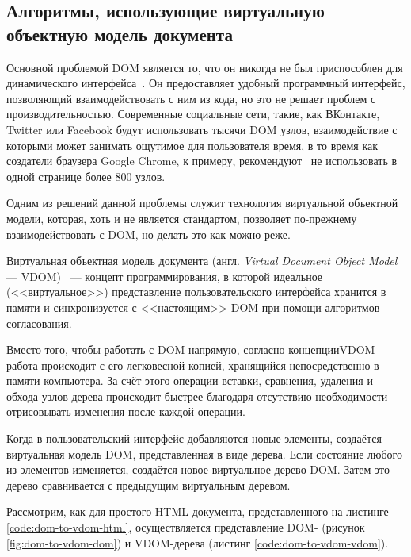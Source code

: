 \subsection{Алгоритмы, использующие виртуальную объектную модель документа}

Основной проблемой DOM является то, что он никогда не был приспособлен для динамического интерфейса~\cite{not-dynamic}.
Он предоставляет удобный программный интерфейс, позволяющий взаимодействовать с ним из кода, но это не решает проблем с производительностью.
Современные социальные сети, такие, как ВКонтакте, Twitter или Facebook будут использовать тысячи DOM узлов, взаимодействие с которыми может занимать ощутимое для пользователя время, в то время как создатели браузера Google Chrome, к примеру, рекомендуют~\cite{dom-max} не использовать в одной странице более 800 узлов.

Одним из решений данной проблемы служит технология виртуальной объектной модели, которая, хоть  и не является стандартом, позволяет по-прежнему взаимодействовать с DOM, но делать это как можно реже.

Виртуальная объектная модель документа (англ. \textit{Virtual Document Object Model} --- VDOM)~\cite{vdom} ---  концепт программирования, в которой идеальное (<<виртуальное>>) представление пользовательского интерфейса хранится в памяти и синхронизуется с <<настоящим>> DOM при помощи алгоритмов согласования.

Вместо того, чтобы работать с DOM напрямую, согласно концепции\break VDOM работа происходит с его легковесной копией, хранящийся непосредственно в памяти компьютера.
За счёт этого операции вставки, сравнения, удаления и обхода узлов дерева происходит быстрее благодаря отсутствию необходимости отрисовывать изменения после каждой операции.

Когда в пользовательский интерфейс добавляются новые элементы, создаётся виртуальная модель DOM, представленная в виде дерева.
Если состояние любого из элементов изменяется, создаётся новое виртуальное дерево DOM.
Затем это дерево сравнивается с предыдущим виртуальным деревом.


Рассмотрим, как для простого  HTML документа, представленного на листинге \ref{code:dom-to-vdom-html}, осуществляется представление DOM- (рисунок \ref{fig:dom-to-vdom-dom}) и VDOM-дерева (листинг \ref{code:dom-to-vdom-vdom}).


